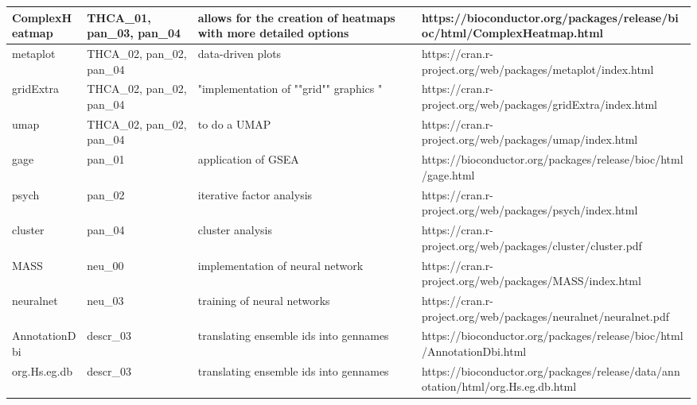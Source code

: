 \documentclass[
  parskip,
  oneside]{scrreprt}
\begin{document}
\begin{table}[!ht]
\begin{tabular}{|m{3cm}|m{3cm}|m{5cm}|m{5cm}|}
        ComplexHeatmap & THCA\_01, pan\_03, pan\_04 & allows for the creation of heatmaps with more detailed options & https://bioconductor.org/packages/release/bioc/html/ComplexHeatmap.html \\ \hline
        metaplot & THCA\_02, pan\_02, pan\_04 & data-driven plots & https://cran.r-project.org/web/packages/metaplot/index.html \\ \hline
        gridExtra & THCA\_02, pan\_02, pan\_04 & "implementation of ""grid"" graphics " & https://cran.r-project.org/web/packages/gridExtra/index.html \\ \hline
        umap & THCA\_02, pan\_02, pan\_04 & to do a UMAP & https://cran.r-project.org/web/packages/umap/index.html \\ \hline
        gage & pan\_01 & application of GSEA & https://bioconductor.org/packages/release/bioc/html/gage.html \\ \hline
        psych & pan\_02 & iterative factor analysis & https://cran.r-project.org/web/packages/psych/index.html \\ \hline
        cluster & pan\_04 & cluster analysis & https://cran.r-project.org/web/packages/cluster/cluster.pdf \\ \hline
        MASS & neu\_00 & implementation of neural network & https://cran.r-project.org/web/packages/MASS/index.html \\ \hline
        neuralnet & neu\_03 & training of neural networks & https://cran.r-project.org/web/packages/neuralnet/neuralnet.pdf \\ \hline
        AnnotationDbi & descr\_03 & translating ensemble ids into gennames  & https://bioconductor.org/packages/release/bioc/html/AnnotationDbi.html \\ \hline
        org.Hs.eg.db & descr\_03 & translating ensemble ids into gennames  & https://bioconductor.org/packages/release/data/annotation/html/org.Hs.eg.db.html \\ \hline
    \end{tabular}
\end{table}
\end{document}
